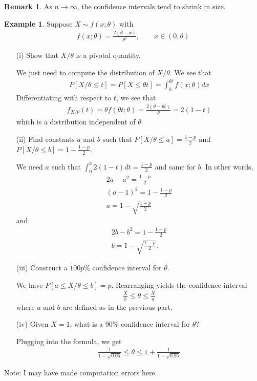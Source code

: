 \documentclass[11pt]{amsart}
\theoremstyle{definition}
\newtheorem{remark}[theorem]{Remark}
\newtheorem{example}[theorem]{Example}
\numberwithin{equation}{section}
\begin{document}
\begin{remark}
    As $n\to\infty$, the confidence intervals tend to shrink in size.
\end{remark}
\begin{example}
    Suppose $X\sim f(x;\theta)$ with 
    \begin{align*}
        f(x;\theta)=\frac{2(\theta-x)}{\theta^2},\qquad x\in(0,\theta)
    \end{align*}
    \begin{enumerate}
        \item [(i)] Show that $X/\theta$ is a pivotal quantity.

        We just need to compute the distribution of $X/\theta$. We see that
        \begin{align*}
            P[X/\theta\le t]=P[X\le \theta t]=\int_0^{\theta t}f(x;\theta)dx
        \end{align*}
        Differentiating with respect to $t$, we see that 
        \begin{align*}
            f_{X/\theta}(t)=\theta f(\theta t;\theta)=\frac{2(\theta-\theta t)}{\theta}=2(1-t)
        \end{align*}
        which is a distribution independent of $\theta$.
        \item [(ii)] Find constants $a$ and $b$ such that $P[X/\theta\le a]=\frac{1-p}{2}$ and $P[X/\theta\le b]=1-\frac{1-p}{2}$.

        We need $a$ such that $\int_0^a2(1-t)dt=\frac{1-p}{2}$ and same for $b$. In other words,
        \begin{align*}
            2a-a^2=\frac{1-p}{2}\\
            (a-1)^2=1-\frac{1-p}{2}\\
            a=1-\sqrt{\frac{1+p}{2}}
        \end{align*}
        and
        \begin{align*}
            2b-b^2=1-\frac{1-p}{2}\\
            b=1-\sqrt{\frac{1-p}{2}}.
        \end{align*}
        \item [(iii)] Construct a $100p\%$ confidence interval for $\theta$.

        We have $P[a\le X/\theta\le b]=p$. Rearranging yields the confidence interval
        \begin{align*}
            \frac{X}{b}\le\theta\le \frac{X}{a}
        \end{align*}
        where $a$ and $b$ are defined as in the previous part.
        \item [(iv)] Given $X=1$, what is a 90\% confidence interval for $\theta$?

        Plugging into the formula, we get
        \begin{align*}
            \frac{1}{1-\sqrt{0.05}}\le \theta\le 1+\frac{1}{1-\sqrt{0.95}}
        \end{align*}
    \end{enumerate}
    Note: I may have made computation errors here.
\end{example}
\end{document}
